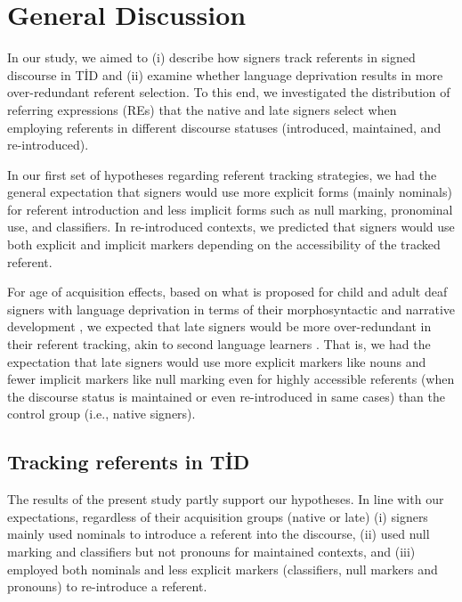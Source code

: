 \documentclass[review]{elsarticle} %
\begin{document}
\hypertarget{general-discussion}{%
\section{General Discussion}\label{general-discussion}}

In our study, we aimed to (i) describe how signers track referents in
signed discourse in TİD and (ii) examine whether language deprivation
results in more over-redundant referent selection. To this end, we
investigated the distribution of referring expressions (REs) that the
native and late signers select when employing referents in different
discourse statuses (introduced, maintained, and re-introduced).

In our first set of hypotheses regarding referent tracking strategies,
we had the general expectation that signers would use more explicit
forms (mainly nominals) for referent introduction and less implicit
forms such as null marking, pronominal use, and classifiers. In
re-introduced contexts, we predicted that signers would use both
explicit and implicit markers depending on the accessibility of the
tracked referent.

For age of acquisition effects, based on what is proposed for child and
adult deaf signers with language deprivation in terms of their
morphosyntactic \citep{boudreault2006, cormier2012, kayabasi2020} and
narrative development \citep{becker2009, cormier2013}, we expected that
late signers would be more over-redundant in their referent tracking,
akin to second language learners \citep{frederiksen2019, bel2015}. That
is, we had the expectation that late signers would use more explicit
markers like nouns and fewer implicit markers like null marking even for
highly accessible referents (when the discourse status is maintained or
even re-introduced in same cases) than the control group (i.e., native
signers).

\hypertarget{tracking-referents-in-tid}{%
\subsection{Tracking referents in TİD}\label{tracking-referents-in-tid}}

The results of the present study partly support our hypotheses. In line
with our expectations, regardless of their acquisition groups (native or
late) (i) signers mainly used nominals to introduce a referent into the
discourse, (ii) used null marking and classifiers but not pronouns for
maintained contexts, and (iii) employed both nominals and less explicit
markers (classifiers, null markers and pronouns) to re-introduce a
referent.
\end{document}
